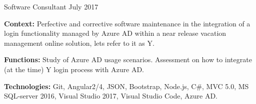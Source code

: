 \begin{cventries}
  \cventry
    {Software Consultant} %
    {} %
    {} %
    {July 2017} %
    {
      \begin{cvitems} %
		\item {\textbf{Context:} Perfective and corrective software maintenance in the integration of a login functionality managed by Azure AD within a near release vacation management online solution, lets refer to it as Y.}
		\item {\textbf{Functions:} Study of Azure AD usage scenarios. Assessment on how to integrate (at the time) Y login process with Azure AD.}		
		\item {\textbf{Technologies:} Git, Angular2/4, JSON, Bootstrap, Node.js, C\#, MVC 5.0, MS SQL-server 2016, Visual Studio 2017, Visual Studio Code, Azure AD.}
      \end{cvitems}
    }   


\end{cventries}
